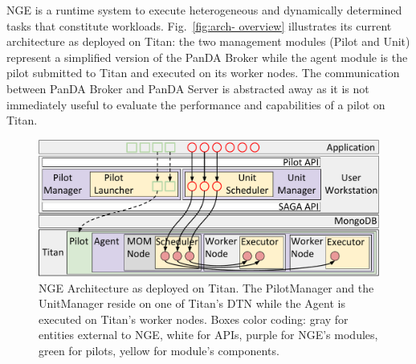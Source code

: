 
 NGE is a runtime system to execute
heterogeneous and dynamically determined tasks that constitute workloads.
Fig.~\ref{fig:arch- overview} illustrates its current architecture as deployed
on Titan: the two management modules (Pilot and Unit) represent a simplified
version of the PanDA Broker while the agent module is the pilot submitted to
Titan and executed on its worker nodes. The communication between PanDA Broker
and PanDA Server is abstracted away as it is not immediately useful to evaluate
the performance and capabilities of a pilot on Titan.


\begin{figure}
  \centering
   \includegraphics[width=\columnwidth]{figures/rp_architecture_compact_atlaswms_paper.pdf}
  \caption{NGE Architecture as deployed on Titan. The PilotManager and the
  UnitManager reside on one of Titan's DTN while the Agent is executed on
  Titan's worker nodes. Boxes color coding: gray for entities external to NGE,
  white for APIs, purple for NGE's modules, green for pilots, yellow for
  module's components.}
\label{fig:arch-overview}
\end{figure}

